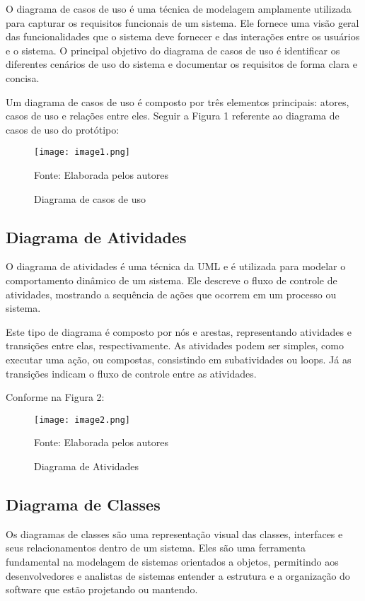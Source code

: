 \documentclass[12pt]{article}
\begin{document}
O diagrama de casos de uso é uma técnica de modelagem amplamente utilizada para capturar os requisitos funcionais de um sistema. Ele fornece uma visão geral das funcionalidades que o sistema deve fornecer e das interações entre os usuários e o sistema. O principal objetivo do diagrama de casos de uso é identificar os diferentes cenários de uso do sistema e documentar os requisitos de forma clara e concisa.

Um diagrama de casos de uso é composto por três elementos principais: atores, casos de uso e relações entre eles. Seguir a Figura 1 referente ao diagrama de casos de uso do protótipo:

\begin{figure}[H]
	\centering
	\texttt{[image: image1.png]}
	\caption{Diagrama de casos de uso}
	\label{fig:diagrama_casos_uso}
	\small Fonte: Elaborada pelos autores
\end{figure}

\subsection{Diagrama de Atividades}

O diagrama de atividades é uma técnica da UML e é utilizada para modelar o comportamento dinâmico de um sistema. Ele descreve o fluxo de controle de atividades, mostrando a sequência de ações que ocorrem em um processo ou sistema.

Este tipo de diagrama é composto por nós e arestas, representando atividades e transições entre elas, respectivamente. As atividades podem ser simples, como executar uma ação, ou compostas, consistindo em subatividades ou loops. Já as transições indicam o fluxo de controle entre as atividades.

Conforme na Figura 2:

\begin{figure}[H]
	\centering
	\texttt{[image: image2.png]}
	\caption{Diagrama de Atividades}
	\label{fig:diagrama_atividades}
	\small Fonte: Elaborada pelos autores
\end{figure}


\subsection{Diagrama de Classes}

Os diagramas de classes são uma representação visual das classes, interfaces e seus relacionamentos dentro de um sistema. Eles são uma ferramenta fundamental na modelagem de sistemas orientados a objetos, permitindo aos desenvolvedores e analistas de sistemas entender a estrutura e a organização do software que estão projetando ou mantendo.
\end{document}

